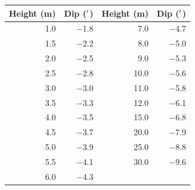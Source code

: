 \begin{tabular}{r r || r r}
\toprule
\textbf{Height (m)} & \textbf{Dip (${}^{\prime}$)} & \textbf{Height (m)} & \textbf{Dip (${}^{\prime}$)}\\
\midrule
1.0 & $-$1.8 & 7.0 & $-$4.7 \\
1.5 & $-$2.2 & 8.0 & $-$5.0 \\
2.0 & $-$2.5 & 9.0 & $-$5.3 \\
2.5 & $-$2.8 & 10.0 & $-$5.6 \\
3.0 & $-$3.0 & 11.0 & $-$5.8 \\
3.5 & $-$3.3 & 12.0 & $-$6.1 \\
4.0 & $-$3.5 & 15.0 & $-$6.8 \\
4.5 & $-$3.7 & 20.0 & $-$7.9 \\
5.0 & $-$3.9 & 25.0 & $-$8.8 \\
5.5 & $-$4.1 & 30.0 & $-$9.6 \\
6.0 & $-$4.3 &  &  \\
\bottomrule
\end{tabular}

